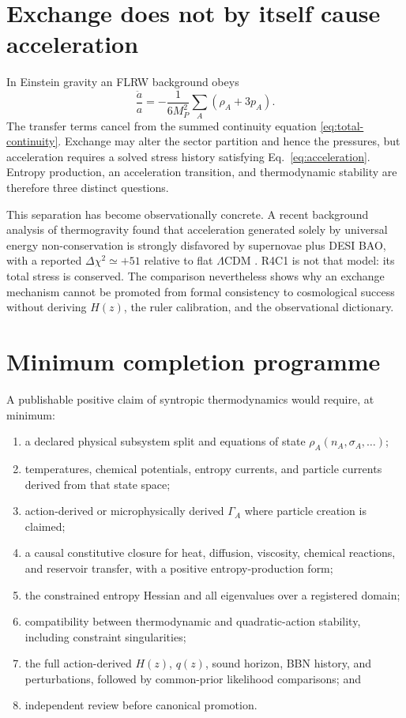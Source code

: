 \documentclass[aps,prd,reprint,superscriptaddress,nofootinbib,floatfix]{revtex4-2}
\begin{document}
\section{Exchange does not by itself cause acceleration}
\label{sec:acceleration}

In Einstein gravity an FLRW background obeys
\begin{equation}
 \frac{\ddot a}{a}
 =-\frac{1}{6M_P^2}
 \sum_A(\rho_A+3p_A).
 \label{eq:acceleration}
\end{equation}
The transfer terms cancel from the summed continuity equation
\eqref{eq:total-continuity}.  Exchange may alter the sector partition and hence
the pressures, but acceleration requires a solved stress history satisfying
Eq.~\eqref{eq:acceleration}.  Entropy production, an acceleration transition,
and thermodynamic stability are therefore three distinct questions.

This separation has become observationally concrete.  A recent background
analysis of thermogravity found that acceleration generated solely by universal
energy non-conservation is strongly disfavored by supernovae plus DESI BAO,
with a reported \(\Delta\chi^2\simeq+51\) relative to flat
\(\Lambda\)CDM \cite{lee2026}.  R4C1 is not that model: its total stress is
conserved.  The comparison nevertheless shows why an exchange mechanism
cannot be promoted from formal consistency to cosmological success without
deriving \(H(z)\), the ruler calibration, and the observational dictionary.

\section{Minimum completion programme}
\label{sec:programme}

A publishable positive claim of syntropic thermodynamics would require, at
minimum:
\begin{enumerate}
\item a declared physical subsystem split and equations of state
\(\rho_A(n_A,\sigma_A,\ldots)\);
\item temperatures, chemical potentials, entropy currents, and particle
currents derived from that state space;
\item action-derived or microphysically derived \(\Gamma_A\) where particle
creation is claimed;
\item a causal constitutive closure for heat, diffusion, viscosity, chemical
reactions, and reservoir transfer, with a positive entropy-production form;
\item the constrained entropy Hessian and all eigenvalues over a registered
domain;
\item compatibility between thermodynamic and quadratic-action stability,
including constraint singularities;
\item the full action-derived \(H(z)\), \(q(z)\), sound horizon, BBN history,
and perturbations, followed by common-prior likelihood comparisons; and
\item independent review before canonical promotion.
\end{enumerate}
\end{document}

